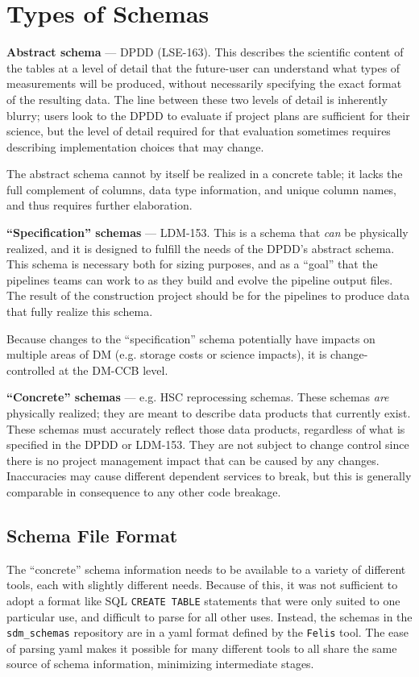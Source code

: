 \section{Types of Schemas}

\textbf{Abstract schema} --- DPDD (LSE-163). This describes the scientific content of the tables at a
level of detail that the future-user can understand what types of measurements will be produced,
without necessarily specifying the exact format of the resulting data. The line between these two
levels of detail is inherently blurry; users look to the DPDD to evaluate if project plans are
sufficient for their science, but the level of detail required for that evaluation sometimes
requires describing implementation choices that may change.

The abstract schema cannot by itself be realized in a concrete table; it lacks the full complement
of columns, data type information, and unique column names, and thus requires further elaboration.

\textbf{``Specification'' schemas} --- LDM-153. This is a schema that \textit{can} be physically
realized, and it is designed to fulfill the needs of the DPDD's abstract schema. This schema is
necessary both for sizing purposes, and as a ``goal'' that the pipelines teams can work to as they
build and evolve the pipeline output files. The result of the construction project should be for the
pipelines to produce data that fully realize this schema.

Because changes to the ``specification'' schema potentially have impacts on multiple areas of DM (e.g.
storage costs or science impacts), it is change-controlled at the DM-CCB level.


\textbf{``Concrete'' schemas} --- e.g. HSC reprocessing schemas. These schemas \textit{are}
physically realized; they are meant to describe data products that currently exist. These schemas
must accurately reflect those data products, regardless of what is specified in the DPDD or LDM-153.
They are not subject to change control since there is no project management impact that can be
caused by any changes. Inaccuracies may cause different dependent services to break, but this is
generally comparable in consequence to any other code breakage.

\subsection{Schema File Format}

The ``concrete'' schema information needs to be available to a variety of different tools, each with
slightly different needs. Because of this, it was not sufficient to adopt a format like SQL
\texttt{CREATE TABLE} statements that were only suited to one particular use, and difficult to parse
for all other uses. Instead, the schemas in the \texttt{sdm\_schemas} repository are in a yaml
format defined by the \texttt{Felis} tool. The ease of parsing yaml makes it possible for many
different tools to all share the same source of schema information, minimizing intermediate stages.

